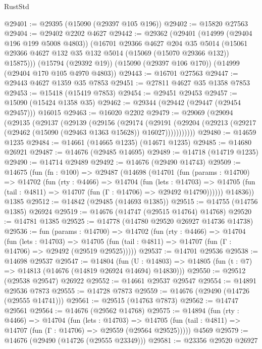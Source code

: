 \begin{lexlean}{RustStd}
\begin{coremodule}
@29401 := @29395 (@15090 (@29397 @105 @196))
@29402 := @15820 @27563
@29404 := @29402 @2202 @4627
@29442 := @29362
    (@29401
      (@14999 (@29404 @196 @199 @5008 @4803))
      (@16701
        @29366
        @4627
        @204
        @35
        @5014
        (@15061 @29366 @4627 @132 @35 @132 @5014 (@15069 (@15070 @29366 @132)) @15875)))
    (@15794 (@29392 @19))
    (@15090 (@29397 @106 @170))
    (@14999 (@29404 @170 @105 @4970 @4803))
@29443 := @16701 @27563
@29447 := @29443 @4627 @1359 @35 @7853
@29451 := @27811 @4627 @35 @1358 @7853
@29453 := @15418 (@15419 @7853)
@29454 := @29451 @29453
@29457 := @15090 (@15424 @1358 @35)
@29462 := @29344 (@29442 (@29447 (@29454 @29457))) @16015
@29463 := @16020 @2202
@29479 := @29069
    (@29094
      (@29135
        (@29137
          (@29139
            (@29156
              (@29174
                (@29191
                  (@29204 (@29213 (@29217 (@29462 (@15090 (@29463 @1363 @15628)) @16027)))))))))))
@29480 := @14659 @1235
@29484 := @14661 (@14665 @1235) (@14671 @1235)
@29485 := @14680 @26921
@29487 := @14676 (@29485 @14695)
@29489 := @14718 (@14719 @1235)
@29490 := @14714 @29489
@29492 := @14676 (@29490 @14743)
@29509 := @14675
    (fun (fn : @100) =>
    @29487
      (@14698
        (@14701
          (fun (params : @14700) =>
          @14702
            (fun (rty : @4466) =>
            @14704
              (fun (lets : @14703) =>
              @14705 (fun (tail : @4811) => @14707 (fun (Γ : @14706) => @29492 @14790))))))
        @14836))
    @1385
@29512 := @14842 (@29485 (@14693 @1385))
@29515 := @14755 (@14756 @1385) @26924
@29519 := @14676 (@14747 (@29515 @14764) @14768)
@29520 := @14781 @1385
@29525 := @14778 (@14780 @29520 @26927 @14736 @14738)
@29536 := fun (params : @14700) =>
  @14702
    (fun (rty : @4466) =>
    @14704
      (fun (lets : @14703) =>
      @14705 (fun (tail : @4811) => @14707 (fun (Γ : @14706) => @29492 (@29519 @29525)))))
@29537 := @14701 @29536
@29538 := @14698 @29537
@29547 := @14804
    (fun (U : @14803) => @14805 (fun (t : @7) => @14813 (@14676 (@14819 @26924 @14694) @14830)))
@29550 := @29512 (@29538 @29547) @26922
@29552 := @14661 @29537 @29547
@29554 := @14891 @29536 @7873
@29555 := @14728 @7873
@29559 := @14676 (@29490 (@14726 (@29555 @14741)))
@29561 := @29515 (@14763 @7873)
@29562 := @14747 @29561
@29564 := @14676 (@29562 @14768)
@29575 := @14894
    (fun (rty : @4466) =>
    @14704
      (fun (lets : @14703) =>
      @14705 (fun (tail : @4811) => @14707 (fun (Γ : @14706) => @29559 (@29564 @29525)))))
    @4569
@29579 := @14676 (@29490 (@14726 (@29555 @23349)))
@29581 := @23356 @29520 @26927

\end{coremodule}
\end{lexlean}
